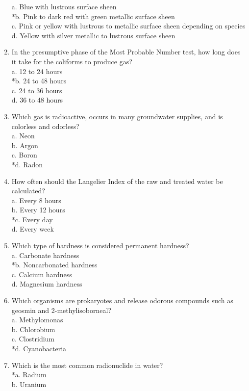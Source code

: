 \begin{enumerate}[1.]
a. Blue with lustrous surface sheen\\
*b. Pink to dark red with green metallic surface sheen\\
c. Pink or yellow with lustrous to metallic surface sheen depending on species\\
d. Yellow with silver metallic to lustrous surface sheen\\
\item In the presumptive phase of the Most Probable Number test, how long does it take for the coliforms to produce gas?\\
a. 12 to 24 hours\\
*b. 24 to 48 hours\\
c. 24 to 36 hours\\
d. 36 to 48 hours\\
\item Which gas is radioactive, occurs in many groundwater supplies, and is colorless and odorless?\\
a. Neon\\
b. Argon\\
c. Boron\\
*d. Radon\\
\item How often should the Langelier Index of the raw and treated water be calculated?\\
a. Every 8 hours\\
b. Every 12 hours\\
*c. Every day\\
d. Every week\\
\item Which type of hardness is considered permanent hardness?\\
a. Carbonate hardness\\
*b. Noncarbonated hardness\\
c. Calcium hardness\\
d. Magnesium hardness\\
\item Which organisms are prokaryotes and release odorous compounds such as geosmin and 2-methylisoborneal?\\
a. Methylomonas\\
b. Chlorobium\\
c. Clostridium\\
*d. Cyanobacteria
\item Which is the most common radionuclide in water?\\
*a. Radium\\
b. Uranium\\

\end{enumerate}

